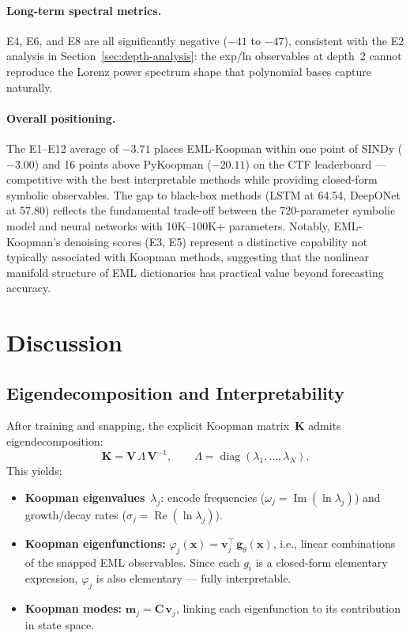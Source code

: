 \documentclass[11pt]{article}
\newcommand{\bx}{\mathbf{x}}
\newcommand{\bg}{\mathbf{g}}
\newcommand{\bK}{\mathbf{K}}
\newcommand{\bC}{\mathbf{C}}
\newcommand{\bV}{\mathbf{V}}
\newcommand{\bv}{\mathbf{v}}
\newcommand{\bm}{\mathbf{m}}
\begin{document}
\paragraph{Long-term spectral metrics.}
E4, E6, and E8 are all significantly negative ($-41$ to $-47$), consistent
with the E2 analysis in Section~\ref{sec:depth-analysis}: the exp/ln
observables at depth~2 cannot reproduce the Lorenz power spectrum shape
that polynomial bases capture naturally.

\paragraph{Overall positioning.}
The E1--E12 average of $-3.71$ places EML-Koopman within one point of
SINDy ($-3.00$) and 16 points above PyKoopman ($-20.11$) on the CTF
leaderboard --- competitive with the best interpretable methods while
providing closed-form symbolic observables.  The gap to black-box
methods (LSTM at 64.54, DeepONet at 57.80) reflects the fundamental
trade-off between the 720-parameter symbolic model and neural networks
with 10K--100K+ parameters.  Notably, EML-Koopman's denoising scores
(E3, E5) represent a distinctive capability not typically associated
with Koopman methods, suggesting that the nonlinear manifold structure
of EML dictionaries has practical value beyond forecasting accuracy.


\section{Discussion}
\label{sec:discussion}

\subsection{Eigendecomposition and Interpretability}

After training and snapping, the explicit Koopman matrix~$\bK$ admits
eigendecomposition:
\begin{equation}\label{eq:eigendecomp}
  \bK = \bV \,\Lambda\, \bV^{-1}, \qquad
  \Lambda = \operatorname{diag}(\lambda_1, \ldots, \lambda_N).
\end{equation}
This yields:

\begin{itemize}
  \item \textbf{Koopman eigenvalues}~$\lambda_j$: encode frequencies
    ($\omega_j = \operatorname{Im}(\ln \lambda_j)$) and growth/decay rates
    ($\sigma_j = \operatorname{Re}(\ln \lambda_j)$).
  \item \textbf{Koopman eigenfunctions:}
    $\varphi_j(\bx) = \bv_j^\top\, \bg_\theta(\bx)$, i.e., linear combinations
    of the snapped EML observables.  Since each $g_i$ is a closed-form elementary
    expression, $\varphi_j$ is also elementary --- fully interpretable.
  \item \textbf{Koopman modes:} $\bm_j = \bC\,\bv_j$, linking each eigenfunction
    to its contribution in state space.
\end{itemize}
\end{document}
